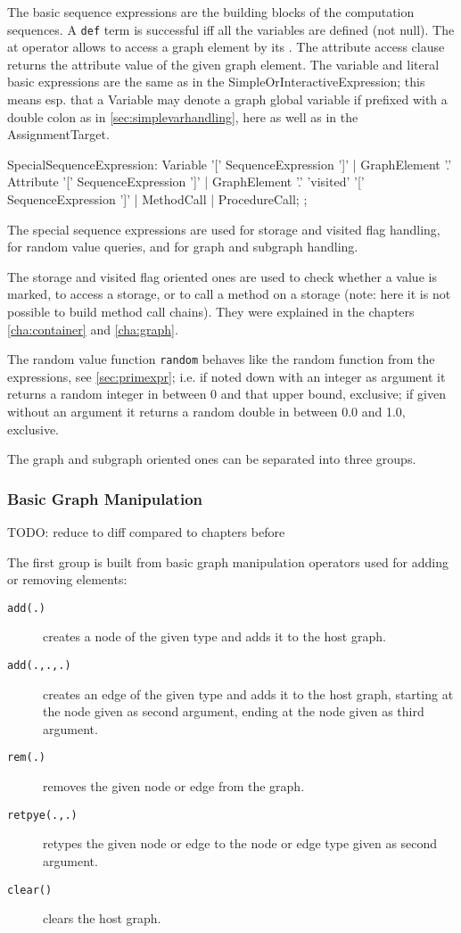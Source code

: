 The basic sequence expressions are the building blocks of the computation sequences.
A \texttt{def} term is successful iff all the variables are defined (not null).
The at operator allows to access a graph element by its .
The attribute access clause returns the attribute value of the given graph element.
The variable and literal basic expressions are the same as in the SimpleOrInteractiveExpression;
this means esp. that a Variable may denote a graph global variable if prefixed with a double colon as in  \ref{sec:simplevarhandling}, here as well as in the AssignmentTarget.

\begin{rail}
  SpecialSequenceExpression:
    Variable '[' SequenceExpression ']' |
    GraphElement '.' Attribute '[' SequenceExpression ']' |
    GraphElement '.' 'visited' '[' SequenceExpression ']' |
    MethodCall |
    ProcedureCall;
  ;
\end{rail}

The special sequence expressions are used for storage and visited flag handling, for random value queries, and for graph and subgraph handling.

The storage and visited flag oriented ones are used to check whether a value is marked, to access a storage, or to call a method on a storage (note: here it is not possible to build method call chains). 
They were explained in the chapters \ref{cha:container} and \ref{cha:graph}.

The random value function \texttt{random} behaves like the random function from the expressions, see \ref{sec:primexpr};
i.e. if noted down with an integer as argument it returns a random integer in between 0 and that upper bound, exclusive; if given without an argument it returns a random double in between 0.0 and 1.0, exclusive.

The graph and subgraph oriented ones can be separated into three groups.

\subsubsection*{Basic Graph Manipulation}
TODO: reduce to diff compared to chapters before

The first group is built from basic graph manipulation operators used for adding or removing elements:

\begin{description}
\item[\texttt{add(.)}] creates a node of the given type and adds it to the host graph.
\item[\texttt{add(.,.,.)}] creates an edge of the given type and adds it to the host graph, starting at the node given as second argument, ending at the node given as third argument.
\item[\texttt{rem(.)}] removes the given node or edge from the graph.
\item[\texttt{retpye(.,.)}] retypes the given node or edge to the node or edge type given as second argument.
\item[\texttt{clear()}] clears the host graph.
\end{description}

